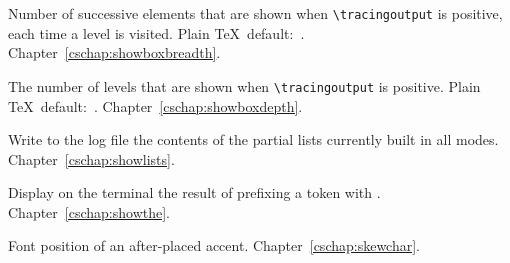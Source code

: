 \begin{glossinventory}
\item [\cs{showboxbreadth}]
      Number of successive elements that are shown when 
      \verb-\tracingoutput- is positive, each time a level is visited.
      Plain \TeX\ default:~.
Chapter~\ref{cschap:showboxbreadth}.

\item [\cs{showboxdepth}] 
      The number of levels that are shown when 
      \verb-\tracingoutput- is positive.
      Plain \TeX\ default:~.
Chapter~\ref{cschap:showboxdepth}.

\item [\cs{showlists}]
      Write to the log file the contents of the partial lists 
      currently built in all modes.
Chapter~\ref{cschap:showlists}.

\item [\cs{showthe\gr{internal quantity}}]
      Display on the terminal the result 
      of prefixing a token with .
Chapter~\ref{cschap:showthe}.

% 
\item [\cs{skewchar\gr{font}}]
      Font position of an after-placed accent.
     Chapter~\ref{cschap:skewchar}.
 

\end{glossinventory}
